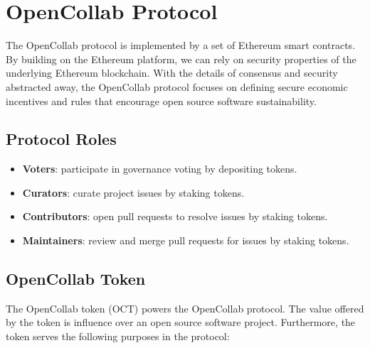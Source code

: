 \section{OpenCollab Protocol}
\label{sec:opencollab}

The OpenCollab protocol is implemented by a set of Ethereum smart contracts. By
building on the Ethereum platform, we can rely on security properties of the
underlying Ethereum blockchain. With the details of consensus and security
abstracted away, the OpenCollab protocol focuses on defining secure economic incentives
and rules that encourage open source software sustainability.

\subsection{Protocol Roles}

\begin{itemize}
  \item \textbf{Voters}: participate in governance voting by depositing tokens.
  \item \textbf{Curators}: curate project issues by staking tokens.
  \item \textbf{Contributors}: open pull requests to resolve issues by staking tokens.
  \item \textbf{Maintainers}: review and merge pull requests for issues by
    staking tokens.
\end{itemize}

\subsection{OpenCollab Token}

The OpenCollab token (OCT) powers the OpenCollab protocol. The value offered by
the token is influence over an open source software project. Furthermore, the
token serves the following purposes in the protocol:

